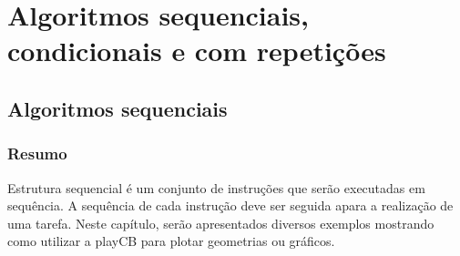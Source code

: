 
\part[Algoritmos sequenciais, condicionais e com repetições]
{Algoritmos sequenciais, condicionais e com repetições}


\chapter[Algoritmos sequenciais]
{Algoritmos sequenciais}



\section{Resumo}

Estrutura sequencial é um conjunto de instruções que serão executadas em sequência. A sequência de cada instrução deve ser seguida apara a realização de uma tarefa.
Neste capítulo, serão apresentados diversos exemplos mostrando como utilizar a playCB para plotar geometrias ou gráficos.


%
%








